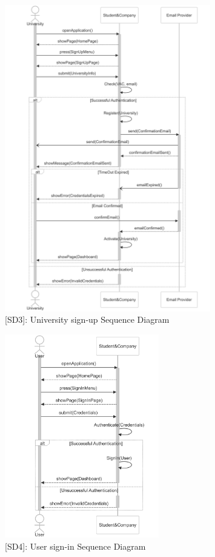 \begin{figure}
    \centering
    \includegraphics[width=0.8\textwidth]{Latex/Images/RASD/SequenceDiagrams/UniversitySignUpSequenceDiagram.png}
    \caption{[SD3]: University sign-up Sequence Diagram}
    \label{fig:SD3}
\end{figure}
\clearpage

\begin{figure}
    \centering
    \includegraphics[width=0.6\textwidth]{Latex/Images/RASD/SequenceDiagrams/UserSignInSequenceDiagram.png}
    \caption{[SD4]: User sign-in Sequence Diagram}
    \label{fig:SD4}
\end{figure}
\clearpage

